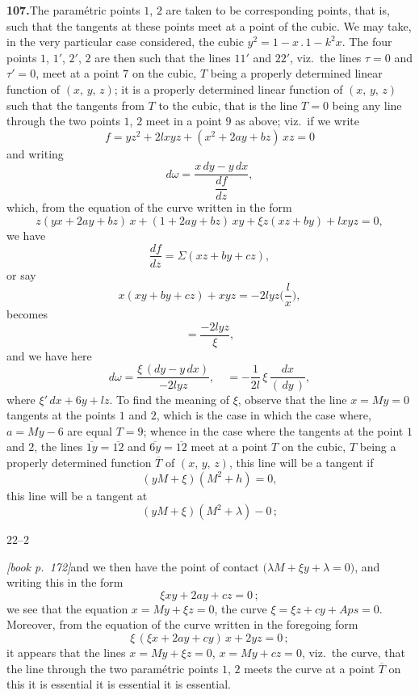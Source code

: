 \documentclass[11pt,a4paper]{article}
\begin{document}
\medskip\noindent\textbf{107.}\quad The param\'etric points $1$, $2$ are taken to be corresponding points, that is, such that the tangents at these points meet at a point of the cubic. We may take, in the very particular case considered, the cubic $y^2 = 1 - x\,.\,1 - k^2 x$. The four points $1$, $1'$, $2'$, $2$ are then such that the lines $11'$ and $22'$, viz.\ the lines $\tau = 0$ and $\tau' = 0$, meet at a point $7$ on the cubic, $T$ being a properly determined linear function of $(x,\,y,\,z)$; it is a properly determined linear function of $(x,\,y,\,z)$ such that the tangents from $T$ to the cubic, that is the line $T = 0$ being any line through the two points $1$, $2$ meet in a point $9$ as above; viz.\ if we write
\[
f = yz^2 + 2lxyz + (x^2 + 2ay + bz)\,xz = 0
\]
and writing
\[
d\omega = \frac{x\,dy - y\,dx}{\dfrac{df}{dz}},
\]
which, from the equation of the curve written in the form
\[
z(yx + 2ay + bz)\,x + (1 + 2ay + bz)\,xy + \xi z (xz + by) + lxyz = 0,
\]
we have
\[
\frac{df}{dz} = \Sigma(xz + by + cz),
\]
or say
\[
x(xy + by + cz) + xyz = -2lyz\bigl(\frac{l}{x}\bigr),
\]
becomes
\[
= \frac{-2lyz}{\xi},
\]
and we have here
\[
d\omega = \frac{\xi\,(dy - y\,dx)}{-2lyz},\quad = -\frac{1}{2l}\,\xi\,\frac{dx}{(\,dy\,)},
\]
where $\xi'\,d x + 6 y + lz$. To find the meaning of $\xi$, observe that the line $x = My = 0$ tangents at the points $1$ and $2$, which is the case in which the case where, $a = My - 6$ are equal $T = 9$; whence in the case where the tangents at the point $1$ and $2$, the lines $\overline{1y} = \overline{12}$ and $\overline{6y} = \overline{12}$ meet at a point $T$ on the cubic, $T$ being a properly determined function $\overline{T}$ of $(x,\,y,\,z)$, this line will be a tangent if
\[
(yM + \xi)(M^2 + h) = 0,
\]
this line will be a tangent at
\[
(yM + \xi)(M^2 + \lambda) - 0\,;
\]

\hfill $22$--$2$

\medskip\noindent\textit{[book p.~172]}\quad and we then have the point of contact $\bigl(\lambda M + \xi y + \lambda = 0\bigr)$, and writing this in the form
\[
\xi xy + 2ay + cz = 0\,;
\]
we see that the equation $x = My + \xi z = 0$, the curve $\xi = \xi z + cy + Aps = 0$. Moreover, from the equation of the curve written in the foregoing form
\[
\xi\,(\xi x + 2ay + cy)\,x + 2 yz = 0\,;
\]
it appears that the lines $x = M y + \xi z = 0$, $x = M y + cz = 0$, viz.\ the curve, that the line through the two param\'etric points $1$, $2$ meets the curve at a point $\overline{T}$ on this it is essential it is essential it is essential.
\end{document}
